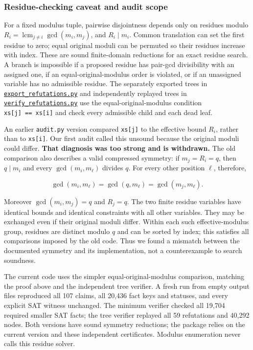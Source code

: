 \documentclass[11pt,a4paper]{article}
\begin{document}
\subsubsection{Residue-checking caveat and audit scope}\label{residue-checking-caveat-and-audit-scope}

For a fixed modulus tuple, pairwise disjointness depends only on residues modulo \(R_i=\operatorname{lcm}_{j\ne i}\gcd(m_i,m_j)\), and \(R_i\mid m_i\). Common translation can set the first residue to zero; equal original moduli can be permuted so their residues increase with index. These are sound finite-domain reductions for an exact residue search. A branch is impossible if a proposed residue has pair-gcd divisibility with an assigned one, if an equal-original-modulus order is violated, or if an unassigned variable has no admissible residue. The separately exported trees in \href{https://github.com/mpelteshki/climbing-to-the-frontier/blob/212bba53b1818c08c40b8c4b48f636651eaf6410/cagent/p4/audit/export_refutations.py}{\texttt{export\_refutations.py}} and independently replayed trees in \href{https://github.com/mpelteshki/climbing-to-the-frontier/blob/212bba53b1818c08c40b8c4b48f636651eaf6410/cagent/p4/audit/verify_refutations.py}{\texttt{verify\_refutations.py}} use the equal-original-modulus condition \texttt{xs{[}j{]}\ ==\ xs{[}i{]}} and check every admissible child and each dead leaf.

An earlier \texttt{audit.py} version compared \texttt{xs{[}j{]}} to the effective bound \(R_i\), rather than to \texttt{xs{[}i{]}}. Our first audit called this unsound because the original moduli could differ. \textbf{That diagnosis was too strong and is withdrawn.} The old comparison also describes a valid compressed symmetry: if \(m_j=R_i=q\), then \(q\mid m_i\) and every \(\gcd(m_i,m_\ell)\) divides \(q\). For every other position \(\ell\), therefore,

\[\gcd(m_i,m_\ell)=\gcd(q,m_\ell)=\gcd(m_j,m_\ell).\]

Moreover \(\gcd(m_i,m_j)=q\) and \(R_j=q\). The two finite residue variables have identical bounds and identical constraints with all other variables. They may be exchanged even if their original moduli differ. Within each such effective-modulus group, residues are distinct modulo \(q\) and can be sorted by index; this satisfies all comparisons imposed by the old code. Thus we found a mismatch between the documented symmetry and its implementation, not a counterexample to search soundness.

The current code uses the simpler equal-original-modulus comparison, matching the proof above and the independent tree verifier. A fresh run from empty output files reproduced all 107 claims, all 20,436 fact keys and statuses, and every explicit SAT witness unchanged. The minimum verifier checked all 19,704 required smaller SAT facts; the tree verifier replayed all 59 refutations and 40,292 nodes. Both versions have sound symmetry reductions; the package relies on the current version and these independent certificates. Modulus enumeration never calls this residue solver.
\end{document}
